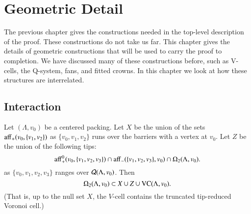 \chapter{Geometric Detail}%
    \label{sec:fine}

The previous chapter gives the constructions
needed in the top-level description of the proof.  
These constructions do not take us far.   This
chapter gives the details of geometric constructions that
will be used to carry the proof to completion. 
We have discussed many of these constructions before, such
as V-cells, the Q-system, fans, and fitted crowns.  In this
chapter we look at how these structures are interrelated.

\section{Interaction}




\begin{lemma} 
Let $(\Lambda,v_0)$ be a centered packing.  Let $X$ be the union
of the sets ${\operatorname{aff}}_+(v_0,\{v_1,v_2\})$ as $\{v_0,v_1,v_2\}$
runs over the barriers with a vertex at $v_0$.  Let $Z$ be the
union of the following tips:
   $$
   {\operatorname{aff}}_+^0(v_0,\{v_1,v_2,v_3\}) \cap {\operatorname{aff}}_-
   (\{v_1,v_2,v_3\},v_0)\cap \Omega_2(\Lambda,v_0).
   $$
as $\{v_0,v_1,v_2,v_3\}$ ranges over ${\mathcal Q}(\Lambda,v_0)$.
Then 
$$\Omega_2(\Lambda,v_0)
 \subset X\cup Z\cup {\operatorname{VC}}(\Lambda,v_0).$$
(That is, up to the null set $X$, the $V$-cell contains
the truncated tip-reduced Voronoi cell.)
\end{lemma}

